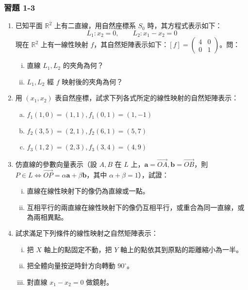 \subsubsection*{習題 1-3}
\begin{enumerate}
  \item 已知平面 $\mathbb{R}^2$ 上有二直線，用自然座標系 $S_0$ 時，其方程式表示如下：
  \[ L_1: x_2 = 0, \qquad L_2: x_1 - x_2 = 0 \]
  現在 $\mathbb{R}^2$ 上有一線性映射 $f$，其自然矩陣表示如下：$[f] = \begin{pmatrix} 4 & 0 \\ 0 & 1 \end{pmatrix}$。問：
  \begin{enumerate}[(i)]
    \item 直線 $L_1, L_2$ 的夾角為何？
    \item $L_1, L_2$ 經 $f$ 映射後的夾角為何？
  \end{enumerate}

  \item 用 $(x_1, x_2)$ 表自然座標，試求下列各式所定的線性映射的自然矩陣表示：
  \begin{enumerate}[a.]
    \item $f_1(1, 0) = (1, 1), f_1(0, 1) = (1, -1)$
    \item $f_2(3, 5) = (2, 1), f_2(6, 1) = (5, 7)$
    \item $f_3(1, 2) = (2, 3), f_3(3, 4) = (4, 9)$
  \end{enumerate}

  \item 仿直線的參數向量表示（設 $A, B$ 在 $L$ 上，$\mathbf{a} = \vec{OA}, \mathbf{b} = \vec{OB}$，則 $P \in L \iff \vec{OP} = \alpha\mathbf{a} + \beta\mathbf{b}$，其中 $\alpha + \beta = 1$），試證：
  \begin{enumerate}[(i)]
    \item 直線在線性映射下的像仍為直線或一點。
    \item 互相平行的兩直線在線性映射下的像仍互相平行，或重合為同一直線，或為兩相異點。
  \end{enumerate}

  \item 試求滿足下列條件的線性映射之自然矩陣表示：
  \begin{enumerate}[(i)]
    \item 把 $X$ 軸上的點固定不動，把 $Y$ 軸上的點依其到原點的距離縮小為一半。
    \item 把全體向量按逆時針方向轉動 $90^\circ$。
    \item 對直線 $x_1 - x_2 = 0$ 做鏡射。
  \end{enumerate}


\end{enumerate}
